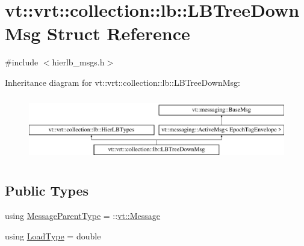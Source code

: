 \hypertarget{structvt_1_1vrt_1_1collection_1_1lb_1_1_l_b_tree_down_msg}{}\section{vt\+:\+:vrt\+:\+:collection\+:\+:lb\+:\+:L\+B\+Tree\+Down\+Msg Struct Reference}
\label{structvt_1_1vrt_1_1collection_1_1lb_1_1_l_b_tree_down_msg}


{\ttfamily \#include $<$hierlb\+\_\+msgs.\+h$>$}

Inheritance diagram for vt\+:\+:vrt\+:\+:collection\+:\+:lb\+:\+:L\+B\+Tree\+Down\+Msg\+:\begin{figure}[H]
\begin{center}
\leavevmode
\includegraphics[height=2.847458cm]{structvt_1_1vrt_1_1collection_1_1lb_1_1_l_b_tree_down_msg}
\end{center}
\end{figure}
\subsection*{Public Types}
\begin{DoxyCompactItemize}
\item 
using \hyperlink{structvt_1_1vrt_1_1collection_1_1lb_1_1_l_b_tree_down_msg_a519ac9259e7e931d2ec529c73917cc56}{Message\+Parent\+Type} = \+::\hyperlink{namespacevt_a3a3ddfef40b4c90915fa43cdd5f129ea}{vt\+::\+Message}
\item 
using \hyperlink{structvt_1_1vrt_1_1collection_1_1lb_1_1_l_b_tree_down_msg_a7027506c735fa124564be187c5e6fb5d}{Load\+Type} = double
\end{DoxyCompactItemize}
